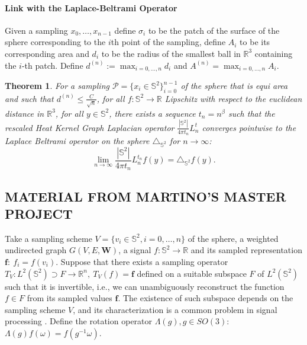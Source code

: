 \documentclass{article} %
\newtheorem{theorem}{Theorem}[section]
\newcommand{\todo}[1]{{\color[rgb]{.6,.1,.6}{#1}}}
\begin{document}
\paragraph{Link with the Laplace-Beltrami Operator}

Given a sampling $x_0, \dots, x_{n-1}$ define $\sigma_i$ to be the patch of the surface of the sphere corresponding to the $i$th point of the sampling, define $A_i$ to be its corresponding area and $d_i$ to be the radius of the smallest ball in $\mathbb R^3$ containing the $i$-th patch. Define $d^{(n)} := \max_{i=0, \dots, n}d_i$ and $A^{(n)}=\max_{i=0, \dots, n}A_i$.

\begin{theorem}
	For a sampling $\mathcal P = \{x_i\in\mathbb S^2\}_{i=0}^{n-1}$ of the sphere that is equi area and such that $d^{(n)} \leq \frac{C}{\sqrt{n}}$, for all $f: \mathbb S^2 \rightarrow \mathbb R$ Lipschitz with respect to the euclidean distance in $\mathbb R^3$, for all $y\in\mathbb S^2$, there exists a sequence $t_n = n^\beta$ such that the rescaled Heat Kernel Graph Laplacian operator $\frac{|\mathbb S^2|}{4\pi t_n}L^t_n$ converges pointwise to the Laplace Beltrami operator on the sphere $\triangle_{\mathbb S^2}$  for $n\to\infty$:
	$$ \lim_{n\to\infty}\frac{|\mathbb S^2|}{4\pi t_n} L_n^{t_n}f(y) =  \triangle_{\mathbb S^2}f(y).$$
	\label{theo:pointwise convergence in the healpix case}
\end{theorem}



\subsection{MATERIAL FROM MARTINO'S MASTER PROJECT}

\todo{
* define a measure of equiv error \\
* show convergence empirically (for Nside up to 1024) \\
* improved upon V1 \\
* no difference in practice (see experiment xx) $\Rightarrow$ NNs are resilient to equiv error \\
}

Take a sampling scheme $V=\{v_i\in\mathbb S^2, i=0, \dots, n\}$ of the sphere, a weighted undirected graph $G(V, E, \mathbf W)$, a signal $f: \mathbb S^2\to\mathbb R$ and its sampled representation $\mathbf f:\ f_i=f(v_i)$. Suppose that there exists a sampling operator $T_V: L^2(\mathbb S^2) \supset F\to \mathbb R^n,\  T_V(f) = \mathbf f$ defined on a suitable subspace $F$ of $L^2(\mathbb S^2)$ such that it is invertible, i.e., we can unambiguously reconstruct the function $f\in F$ from its sampled values $\mathbf f$. The existence of such subspace depends on the sampling scheme $V$, and its characterization is a common problem in signal processing \cite{Driscoll:1994:CFT:184069.184073}. Define the rotation operator $\Lambda(g), g\in SO(3)$: $\Lambda(g) f(\omega) = f\left(g^{-1} \omega\right)$.
\end{document}
